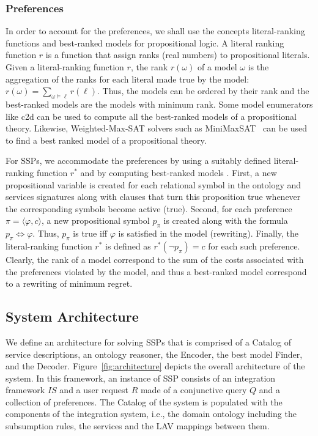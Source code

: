 \documentclass{llncs}
\newcommand{\tup}[1]{\langle #1 \rangle}
\begin{document}
\subsubsection{Preferences}

In order to account for the preferences, we shall use the
concepts literal-ranking functions and best-ranked models for
propositional logic. A literal ranking function $r$ is a function
that assign ranks (real numbers) to propositional literals.
Given a literal-ranking function $r$, the rank $r(\omega)$ of
a model $\omega$ is the aggregation of the ranks for each literal
made true by the model: $r(\omega)=\sum_{\omega\vDash\ell} r(\ell)$.
Thus, the models can be ordered by their rank and the best-ranked
models are the models with minimum rank.
Some model enumerators like c2d can be used to compute all the
best-ranked models of a propositional theory.
Likewise, Weighted-Max-SAT solvers such as MiniMaxSAT~\cite{HerasetalJAIR2008}
can be used to find a best ranked model of a propositional theory.

For SSPs, we accommodate the preferences by using a suitably defined
literal-ranking function $r^*$ and by computing best-ranked models
\cite{darwiche:weighted}.
First, a new propositional variable is created for each relational
symbol in the ontology and services signatures along with clauses
that turn this proposition true whenever the corresponding symbols
become active (true). Second, for each preference $\pi=\tup{\varphi,c}$,
a new propositional symbol $p_\pi$ is created along with the
formula $p_\pi \Leftrightarrow \varphi$. Thus, $p_\pi$ is true
iff $\varphi$ is satisfied in the model (rewriting).
Finally, the literal-ranking function $r^*$ is defined as 
$r^*(\neg p_\pi)=c$ for each such preference.
Clearly, the rank of a model correspond to the sum of the costs
associated with the preferences violated by the model, and thus
a best-ranked model correspond to a rewriting of minimum regret.

\subsection{System Architecture}

We define an architecture for solving SSPs that is comprised of a Catalog of
service descriptions, an ontology reasoner, the Encoder, the best model Finder,
and the Decoder.
Figure~\ref{fig:architecture} depicts the overall architecture of the system.
In this framework, an instance of SSP consists of an integration framework $IS$
and a user request $R$ made of a conjunctive query $Q$ and a collection of
preferences.
The Catalog of the system is populated with the components of the integration system,
i.e., the domain ontology including the subsumption rules, the services and the LAV
mappings between them. 
\end{document}
